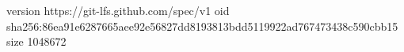 version https://git-lfs.github.com/spec/v1
oid sha256:86ea91e6287665aee92e56827dd8193813bdd5119922ad767473438c590cbb15
size 1048672
